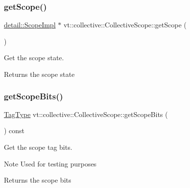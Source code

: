 \subsubsection{\texorpdfstring{get\+Scope()}{getScope()}}
{\footnotesize\ttfamily \hyperlink{structvt_1_1collective_1_1detail_1_1_scope_impl}{detail\+::\+Scope\+Impl} $\ast$ vt\+::collective\+::\+Collective\+Scope\+::get\+Scope (\begin{DoxyParamCaption}{ }\end{DoxyParamCaption})\hspace{0.3cm}{\ttfamily [private]}}



Get the scope state. 

\begin{DoxyReturn}{Returns}
the scope state 
\end{DoxyReturn}
\mbox{\label{structvt_1_1collective_1_1_collective_scope_abed60df0901f32a362a908dccdcbe0fb}} 
\subsubsection{\texorpdfstring{get\+Scope\+Bits()}{getScopeBits()}}
{\footnotesize\ttfamily \hyperlink{namespacevt_a84ab281dae04a52a4b243d6bf62d0e52}{Tag\+Type} vt\+::collective\+::\+Collective\+Scope\+::get\+Scope\+Bits (\begin{DoxyParamCaption}{ }\end{DoxyParamCaption}) const\hspace{0.3cm}{\ttfamily [inline]}}



Get the scope tag bits. 

\begin{DoxyNote}{Note}
Used for testing purposes
\end{DoxyNote}
\begin{DoxyReturn}{Returns}
the scope bits 
\end{DoxyReturn}
\mbox{\label{structvt_1_1collective_1_1_collective_scope_acc386201ec9e82dbe2691b4ce528a4c2}} 
